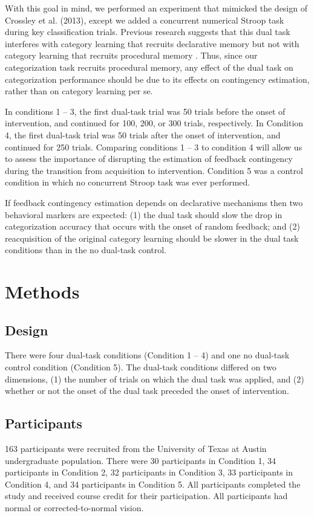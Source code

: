 \documentclass[man,apacite,draftfirst]{apa6}
\begin{document}
With this goal in mind, we performed an experiment that mimicked the design of Crossley et al. (2013), except we added a concurrent numerical Stroop task during key classification trials. Previous research suggests that this dual task interferes with category learning that recruits declarative memory but not with category learning that recruits procedural memory \cite{WaldronAshby2001}. Thus, since our categorization task recruits procedural memory, any effect of the dual task on categorization performance should be due to its effects on contingency estimation, rather than on category learning per se.

In conditions 1 -- 3, the first dual-task trial was 50 trials before the onset of intervention, and continued for 100, 200, or 300 trials, respectively. In Condition 4, the first dual-task trial was 50 trials after the onset of intervention, and continued for 250 trials.
Comparing conditions 1 -- 3 to condition 4 will allow us to assess the
importance of disrupting the estimation of feedback contingency during the 
transition from acquisition to intervention. Condition 5 was a control condition
in which no concurrent Stroop task was ever performed. 

If feedback contingency estimation depends on declarative mechanisms then
two behavioral markers are expected: (1) the dual task should slow the drop in categorization accuracy that occurs with the onset of random feedback; and (2) reacquisition of the original category learning should be slower in the dual task conditions than in the no dual-task control.

\section*{Methods}
\subsection*{Design}
There were four dual-task conditions (Condition 1 -- 4) and one no
dual-task control condition (Condition 5). The dual-task conditions differed on
two dimensions, (1) the number of trials on which the dual task was applied, and
(2) whether or not the onset of the dual task preceded the onset of
intervention.

\subsection*{Participants}
163 participants were recruited from the University of Texas at Austin
undergraduate population. There were 30 participants in Condition 1, 34
participants in Condition 2, 32 participants in Condition 3, 33 participants in
Condition 4, and 34 participants in Condition 5. All participants completed the
study and received course credit for their participation. All participants had
normal or corrected-to-normal vision.
\end{document}
